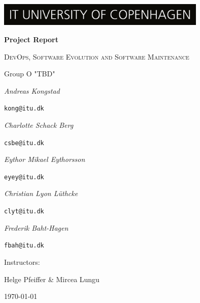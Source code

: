 \documentclass{scrartcl}
\begin{document}
\begin{titlepage}
    \centering
    \includegraphics[width=10cm]{images/ITU_logo_UK jpg.jpg}
    \vspace{1.5cm}
    
	{\huge\bfseries Project Report\par}
	\vspace{1cm}
    {\scshape\Large DevOps, Software Evolution and Software Maintenance \par}
	\vspace{2cm}
	{\Large Group O "TBD"}\par
	\vspace{0.5cm}
	{\Large\itshape Andreas Kongstad}\par
	\texttt{kong@itu.dk}\par
	\vspace{0.5cm}
	{\Large\itshape Charlotte Schack Berg}\par
	\texttt{csbe@itu.dk}\par
	\vspace{0.5cm}
	{\Large\itshape Eythor Mikael Eythorsson}\par
	\texttt{eyey@itu.dk}\par
	\vspace{0.5cm}
	{\Large\itshape Christian Lyon Lüthcke}\par
	\texttt{clyt@itu.dk}\par
	\vspace{0.5cm}
	{\Large\itshape Frederik Baht-Hagen}\par
	\texttt{fbah@itu.dk}\par
	\vfill
	Instructors:\par
    Helge Pfeiffer \& Mircea Lungu

	\vspace{1cm}

	{\large \today\par}
\end{titlepage}

\newpage
\tableofcontents

\clearpage


\clearpage

\clearpage

\clearpage

\printbibliography
\clearpage
\appendix

\end{document}
